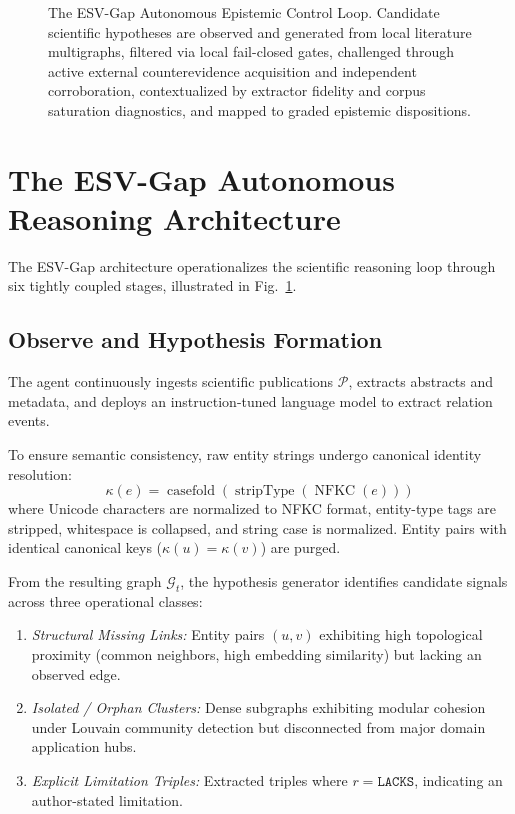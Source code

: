 \documentclass[conference,10pt]{IEEEtran}
\newcommand{\method}{ESV-Gap}
\begin{document}
\begin{figure}[t]
{\begin{tikzpicture}
\end{tikzpicture}}
\caption{The \method{} Autonomous Epistemic Control Loop. Candidate scientific hypotheses are observed and generated from local literature multigraphs, filtered via local fail-closed gates, challenged through active external counterevidence acquisition and independent corroboration, contextualized by extractor fidelity and corpus saturation diagnostics, and mapped to graded epistemic dispositions.}
\label{fig:architecture_loop}
\end{figure}

\section{The \method{} Autonomous Reasoning Architecture}

The \method{} architecture operationalizes the scientific reasoning loop through six tightly coupled stages, illustrated in Fig.~\ref{fig:architecture_loop}.

\subsection{Observe and Hypothesis Formation}
The agent continuously ingests scientific publications $\mathcal{P}$, extracts abstracts and metadata, and deploys an instruction-tuned language model to extract relation events.

To ensure semantic consistency, raw entity strings undergo canonical identity resolution:
\begin{equation}
\kappa(e) = \operatorname{casefold}(\operatorname{stripType}(\operatorname{NFKC}(e)))
\end{equation}
where Unicode characters are normalized to NFKC format, entity-type tags are stripped, whitespace is collapsed, and string case is normalized. Entity pairs with identical canonical keys ($\kappa(u) = \kappa(v)$) are purged.

From the resulting graph $\mathcal{G}_t$, the hypothesis generator identifies candidate signals across three operational classes:
\begin{enumerate}[label=\alph*),leftmargin=1.5em]
  \item \emph{Structural Missing Links:} Entity pairs $(u, v)$ exhibiting high topological proximity (common neighbors, high embedding similarity) but lacking an observed edge.
  \item \emph{Isolated / Orphan Clusters:} Dense subgraphs exhibiting modular cohesion under Louvain community detection but disconnected from major domain application hubs.
  \item \emph{Explicit Limitation Triples:} Extracted triples where $r = \texttt{LACKS}$, indicating an author-stated limitation.
\end{enumerate}
\end{document}
